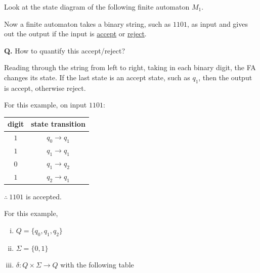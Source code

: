 \begin{example}
Look at the state diagram of the following finite automaton $M_1$.

\begin{center}
\end{center}

Now a finite automaton takes a binary string, such as $1101$, as input and gives out the output if the input is \underline{accept} or \underline{reject}.

\medskip
\noindent\textbf{Q.} How to quantify this accept/reject?

Reading through the string from left to right, taking in each binary digit, the FA changes its state. If the last state is an accept state, such as $q_1$, then the output is accept, otherwise reject.

\bigskip
\noindent For this example, on input $1101$:

\begin{center}
\begin{tabular}{c c}
digit & state transition \\ \hline
$1$ & $q_0 \to q_1$ \\
$1$ & $q_1 \to q_1$ \\
$0$ & $q_1 \to q_2$ \\
$1$ & $q_2 \to q_1$
\end{tabular}
\end{center}

\noindent $\therefore\ 1101$ is accepted.
\end{example}

\bigskip
\noindent For this example,
\begin{enumerate}[(i)]
    \item $Q = \{q_0, q_1, q_2\}$
    \item $\Sigma = \{0, 1\}$
    \item $\delta : Q \times \Sigma \to Q$ with the following table
\end{enumerate}

